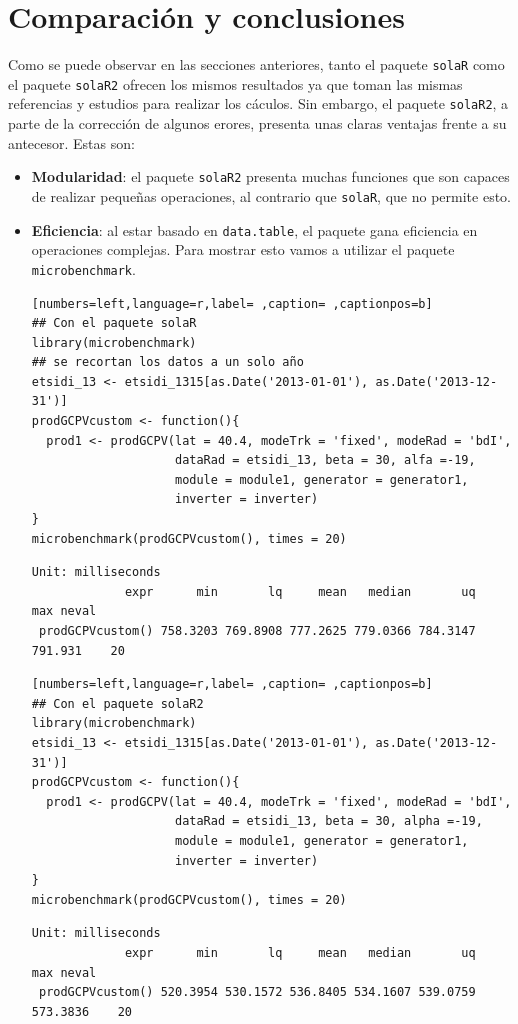 \section{Comparación y conclusiones}
\label{sec:org1768c74}
\label{sec:comparacion-conclusiones}
Como se puede observar en las secciones anteriores, tanto el paquete \texttt{solaR} como el paquete \texttt{solaR2} ofrecen los mismos resultados ya que toman las mismas referencias y estudios para realizar los cáculos. Sin embargo, el paquete \texttt{solaR2}, a parte de la corrección de algunos erores, presenta unas claras ventajas frente a su antecesor. Estas son:
\begin{itemize}
\item \textbf{Modularidad}: el paquete \texttt{solaR2} presenta muchas funciones que son capaces de realizar pequeñas operaciones, al contrario que \texttt{solaR}, que no permite esto.
\item \textbf{Eficiencia}: al estar basado en \texttt{data.table}, el paquete gana eficiencia en operaciones complejas. Para mostrar esto vamos a utilizar el paquete \texttt{microbenchmark}.
\begin{lstlisting}[numbers=left,language=r,label= ,caption= ,captionpos=b]
## Con el paquete solaR
library(microbenchmark)
## se recortan los datos a un solo año
etsidi_13 <- etsidi_1315[as.Date('2013-01-01'), as.Date('2013-12-31')]
prodGCPVcustom <- function(){  
  prod1 <- prodGCPV(lat = 40.4, modeTrk = 'fixed', modeRad = 'bdI',
                    dataRad = etsidi_13, beta = 30, alfa =-19,
                    module = module1, generator = generator1,
                    inverter = inverter)
}
microbenchmark(prodGCPVcustom(), times = 20)
\end{lstlisting}

\begin{verbatim}
Unit: milliseconds
             expr      min       lq     mean   median       uq     max neval
 prodGCPVcustom() 758.3203 769.8908 777.2625 779.0366 784.3147 791.931    20
\end{verbatim}


\begin{lstlisting}[numbers=left,language=r,label= ,caption= ,captionpos=b]
## Con el paquete solaR2
library(microbenchmark)
etsidi_13 <- etsidi_1315[as.Date('2013-01-01'), as.Date('2013-12-31')]
prodGCPVcustom <- function(){  
  prod1 <- prodGCPV(lat = 40.4, modeTrk = 'fixed', modeRad = 'bdI',
                    dataRad = etsidi_13, beta = 30, alpha =-19,
                    module = module1, generator = generator1,
                    inverter = inverter)
}
microbenchmark(prodGCPVcustom(), times = 20)
\end{lstlisting}

\begin{verbatim}
Unit: milliseconds
             expr      min       lq     mean   median       uq      max neval
 prodGCPVcustom() 520.3954 530.1572 536.8405 534.1607 539.0759 573.3836    20
\end{verbatim}
\end{itemize}
